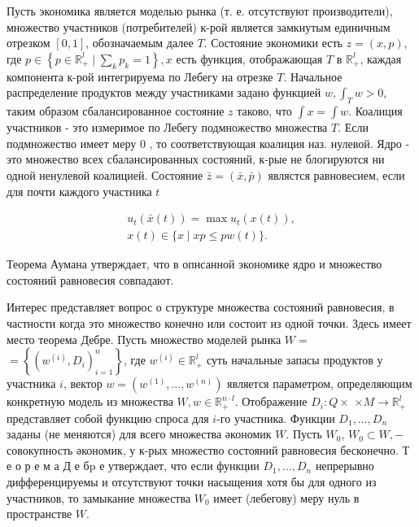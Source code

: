 \documentclass[10pt]{article}
\begin{document}
Пусть экономика является моделью рынка (т. е. отсутствуют производители), множество участников (потребителей) к-рой является замкнутым единичным отрезком $[0,1]$, обозначаемым далее $T$. Состояние экономики есть $z=(x, p)$, где $p \in\left\{p \in \mathbb{R}_{+}^{l} \mid \sum_{k} p_{k}=1\right\}, x$ есть функция, отображающая $T$ в $\mathbb{R}_{+}^{l}$, каждая компонента к-рой интегрируема по Лебегу на отрезке $T$. Начальное распределение продуктов между участниками задано функцией $w, \int_{T} w>0$, таким образом сбалансированное состояние $z$ таково, что $\int x=\int w$. Коалиция участников - это измеримое по Лебегу подмножество множества $T$. Если подмножество имеет меру 0 , то соответствующая коалиция наз. нулевой. Ядро - это множество всех сбалансированных состояний, к-рые не блогируются ни одной ненулевой коалицией. Состояние $\bar{z}=(\bar{x}, \bar{p})$ являстся равновесием, если для почти каждого участника $t$



\[

\begin{gathered}

u_{t}(\bar{x}(t))=\max u_{t}(x(t)), \\

x(t) \in\{x \mid x p \leqslant p w(t)\} .

\end{gathered}

\]



Теорема Аумана утверждает, что в опнсанной экономике ядро и множество состояний равновесия совпадают.



Интерес представляет вопрос о структуре множества состояний равновесия, в частности когда это множество конечно или состоит из одной точки. Здесь имеет место теорема Дебре. Пусть множество моделей рынка $W=$ $=\left\{\left(w^{(i)}, D_{i}\right)_{i=1}^{n}\right\}$, где $w^{(i)} \in \mathbb{R}_{+}^{l}$ суть начальные запасы продуктов у участника $i$, вектор $w=\left(w^{(1)}, \ldots, w^{(n)}\right)$ является параметром, определяющим конкретную модель из множества $W, w \in \mathbb{R}_{+}^{n \cdot l}$. Отображение $D_{i}: Q \times$ $\times M \rightarrow \mathbb{R}_{+}^{l}$ представляет собой функцию спроса для $i$-го участника. Функции $D_{1}, \ldots, D_{n}$ заданы (не меняются) для всего множества әкономик $W$. Пусть $W_{0}$, $W_{0} \subset W,-$ совокупность әкономик, у к-рых множество состояний равновесия бесконечно. Т е о р е м а Д е бp е утверждает, что если функции $D_{1}, \ldots, D_{n}$ непрерывно дифференцируемы и отсутствуют точки насыщения хотя бы для одного из участников, то замыкание множества $W_{0}$ имеет (лебегову) меру нуль в пространстве $W$.
\end{document}
